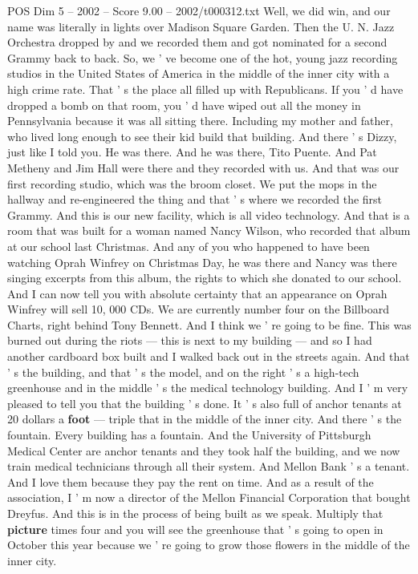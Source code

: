 \begin{textsample}{POS Dim 5 – 2002 – Score 9.00 – 2002/t000312.txt}
Well, we did win, and our name was literally in lights over Madison Square Garden.
Then the U.
N.
Jazz Orchestra dropped by and we recorded them and got nominated for a second Grammy back to back.
So, we ' ve become one of the hot, young jazz recording studios in the United States of America in the middle of the inner city with a high crime rate.
That ' s the place all filled up with Republicans.
If you ' d have dropped a bomb on that room, you ' d have wiped out all the money in Pennsylvania because it was all sitting there.
Including my mother and father, who lived long enough to see their kid build that building.
And there ' s Dizzy, just like I told you.
He was there.
And he was there, Tito Puente.
And Pat Metheny and Jim Hall were there and they recorded with us.
And that was our first recording studio, which was the broom closet.
We put the mops in the hallway and re-engineered the thing and that ' s where we recorded the first Grammy.
And this is our new facility, which is all video technology.
And that is a room that was built for a woman named Nancy Wilson, who recorded that album at our school last Christmas.
And any of you who happened to have been watching Oprah Winfrey on Christmas Day, he was there and Nancy was there singing excerpts from this album, the rights to which she donated to our school.
And I can now tell you with absolute certainty that an appearance on Oprah Winfrey will sell 10, 000 CDs.
We are currently number four on the Billboard Charts, right behind Tony Bennett.
And I think we ' re going to be fine.
This was burned out during the riots — this is next to my building — and so I had another cardboard box built and I walked back out in the streets again.
And that ' s the building, and that ' s the model, and on the right ' s a high-tech greenhouse and in the middle ' s the medical technology building.
And I ' m very pleased to tell you that the building ' s done.
It ' s also full of anchor tenants at 20 dollars a \textbf{foot} — triple that in the middle of the inner city.
And there ' s the fountain.
Every building has a fountain.
And the University of Pittsburgh Medical Center are anchor tenants and they took half the building, and we now train medical technicians through all their system.
And Mellon Bank ' s a tenant.
And I love them because they pay the rent on time.
And as a result of the association, I ' m now a director of the Mellon Financial Corporation that bought Dreyfus.
And this is in the process of being built as we speak.
Multiply that \textbf{picture} times four and you will see the greenhouse that ' s going to open in October this year because we ' re going to grow those flowers in the middle of the inner city.

\end{textsample}
